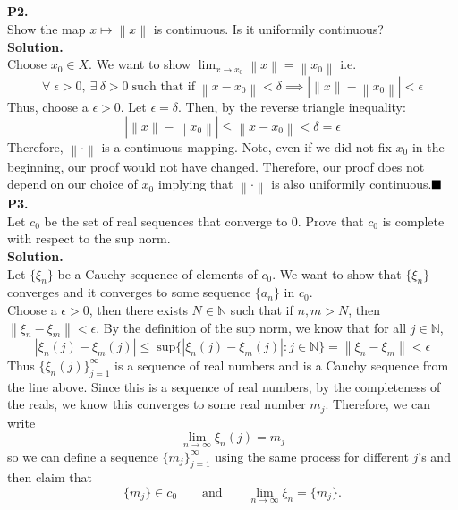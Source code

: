 \documentclass{article}
\newcommand{\norm}[1]{\left\lVert#1\right\rVert}
\begin{document}
    \newpage

    \textbf{P2.}\\

    Show the map $x\mapsto\norm{x}$ is continuous. Is it uniformily continuous?\\

    \textbf{Solution.}\\

    Choose $x_0\in X$. We want to show $\lim_{x\to x_0} \norm{x} = \norm{x_0}$ i.e.
    \[ \forall\; \epsilon>0,\:\exists\:\delta>0\;\text{such that if}\;\norm{x-x_0}<\delta \implies |\norm{x}-\norm{x_0}|<\epsilon \]
    Thus, choose a $\epsilon>0$. Let $\epsilon=\delta$. Then, by the reverse triangle inequality:
    \[ |\norm{x}-\norm{x_0}| \leq \norm{x-x_0} < \delta = \epsilon \]
    Therefore, $\norm{\cdot}$ is a continuous mapping. Note, even if we did not fix $x_0$ in the beginning, our proof would not 
    have changed. Therefore, our proof does not depend on our choice of $x_0$ implying that $\norm{\cdot}$ is also
    uniformily continuous.$\hfill\blacksquare$\\

    \textbf{P3.}\\

    Let $c_0$ be the set of real sequences that converge to 0. Prove that $c_0$ is complete with respect to the sup norm.\\

    \textbf{Solution.}\\

    Let $\{\xi_n\}$ be a Cauchy sequence of elements of $c_0$. We want to show that $\{\xi_n\}$ converges and it converges to some
    sequence $\{a_n\}$ in $c_0$.\\
    Choose a $\epsilon>0$, then there exists $N\in\mathbb{N}$ such that if $n,m>N$, then $\norm{\xi_n - \xi_m} < \epsilon$.
    By the definition of the sup norm, we know that for all $j\in\mathbb{N}$,
    \[ |\xi_n(j) - \xi_m(j)| \leq\;\text{sup}\{|\xi_n(j)-\xi_m(j)|: j\in\mathbb{N}\} = \norm{\xi_n - \xi_m} < \epsilon \]
    Thus $\{\xi_n(j)\}_{j=1}^{\infty}$ is a sequence of real numbers and is a Cauchy sequence from the line above. 
    Since this is a sequence of real numbers, by the completeness of the reals, we know this converges to some real 
    number $m_j$. Therefore, we can write
    \[ \lim_{n\to\infty} \xi_n(j) = m_j \]
    so we can define a sequence $\{m_j\}_{j=1}^{\infty}$ using the same process for different $j$'s and then claim that 
    \[ \{m_j\}\in c_0 \qquad \text{and} \qquad \lim_{n\to\infty} \xi_n = \{m_j\}. \]
\end{document}

